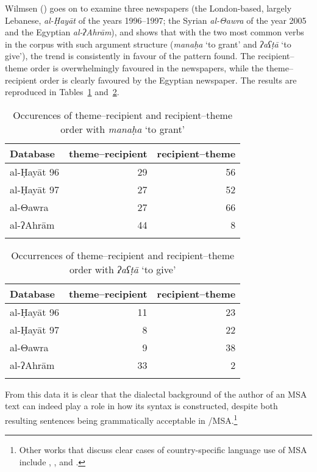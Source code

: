 \documentclass[output=paper]{langsci/langscibook}
\begin{document}
Wilmsen (\citeyear[114--115]{Wilmsen2010}) goes on to examine three newspapers (the London-based, largely Lebanese, \textit{al-Ḥayāt} of the years 1996--1997; the Syrian \textit{al-Θawra} of the year 2005 and the Egyptian \textit{al-ʔAhrām}), and shows that with the two most common verbs in the corpus with such argument structure (\textit{manaḥa} ‘to grant’ and \textit{ʔaʕṭā} ‘to give’), the trend is consistently in favour of the pattern found. The recipient–theme order is overwhelmingly favoured in the  newspapers, while the theme–recipient order is clearly favoured by the Egyptian newspaper. The results are reproduced in Tables~\ref{tab:vanputten:1} and~\ref{tab:vanputten:2}.


\begin{table}
\begin{tabular}{lrr}
\lsptoprule
{Database} & {theme–recipient} & {recipient–theme}\\\midrule
al-Ḥayāt 96 & 29 & 56\\
al-Ḥayāt 97 & 27 & 52\\
al-Θawra & 27 & 66\\
al-ʔAhrām & 44 & \hphantom{1}8\\
\lspbottomrule
\end{tabular}
\caption{\label{bkm:Ref533762442}\label{tab:vanputten:1}Occurences of theme–recipient and recipient–theme order with \textit{manaḥa} ‘to grant’}
\end{table}

\begin{table}
\begin{tabular}{lrr}
\lsptoprule
{Database} & {theme–recipient} & {recipient–theme}\\\midrule
al-Ḥayāt 96 & 11 & 23\\
al-Ḥayāt 97 & \hphantom{1}8 & 22\\
al-Θawra    &  \hphantom{1}9 & 38\\
al-ʔAhrām   & 33 &  \hphantom{1}2\\
\lspbottomrule
\end{tabular}
\caption{\label{bkm:Ref533762457}\label{tab:vanputten:2}Occurrences of theme–recipient and recipient–theme order with \textit{ʔaʕṭā} ‘to give’}
\end{table}

From this data it is clear that the dialectal background of the author of an MSA text can indeed play a role in how its syntax is constructed, despite both resulting sentences being grammatically acceptable in /MSA.\footnote{Other works that discuss clear cases of country-specific language use of MSA include \citet{Ibrahim2009}, \citet{Parkinson2003},  \citet{Parkinson2007} and \citet{ParkinsonIbrahim1999}.}
\end{document}
